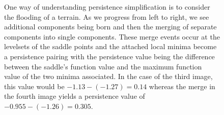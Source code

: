 \begin{figure}[!ht]
  \centering
  \caption[Illustration of Persistence Pairing]{One way of understanding
  persistence simplification is to consider the flooding of a terrain.
  As we progress from left to right, we see additional components being born and then the merging of separate components into single components.
  These merge events occur at the levelsets of the saddle points and the attached local minima become a persistence pairing with the persistence value being the difference between the saddle's function value and the maximum function value of the two minima associated.
  In the case of the third image, this value would be $-1.13-(-1.27)=0.14$ whereas the merge in the fourth image yields a persistence value of $-0.955-(-1.26)=0.305$.}
  \label{fig:persistenceFill}
\end{figure}

